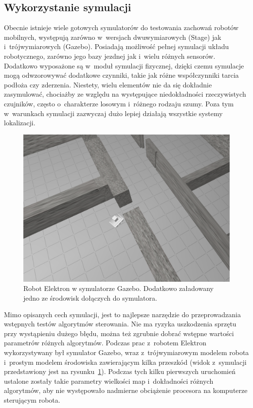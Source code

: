 \subsection{Wykorzystanie symulacji}

Obecnie istnieje wiele gotowych symulatorów do testowania zachowań robotów
mobilnych, występują zarówno w~wersjach dwuwymiarowych (Stage) jak i~trójwymiarowych
(Gazebo). Posiadają możliwość pełnej symulacji układu robotycznego, zarówno
jego bazy jezdnej jak i~wielu różnych sensorów. Dodatkowo wyposażone są
w~moduł symulacji fizycznej, dzięki czemu symulacje mogą odwzorowywać dodatkowe
czynniki, takie jak różne współczynniki tarcia podłoża czy zderzenia.
Niestety, wielu elementów nie da się dokładnie zasymulować, chociażby ze
względu na występujące niedokładności rzeczywistych czujników, często o~charakterze
losowym i~różnego rodzaju szumy. Poza tym w~warunkach symulacji zazwyczaj dużo
lepiej działają wszystkie systemy lokalizacji.

\begin{figure}[htb!]
\centering
\includegraphics[width=13cm]{../img/gazebo}
\caption[Robot Elektron w symulatorze Gazebo]{Robot Elektron w symulatorze Gazebo.
Dodatkowo załadowany jedno ze środowisk dołączych do symulatora.}
\label{fig:gazebo}
\end{figure}

Mimo opisanych cech symulacji, jest to najlepsze narzędzie do przeprowadzania
wstępnych testów algorytmów sterowania. Nie ma ryzyka uszkodzenia sprzętu
przy wystąpieniu dużego błędu, można też zgrubnie dobrać wstępne wartości
parametrów różnych algorytmów. Podczas prac z~robotem Elektron wykorzystywany
był symulator Gazebo, wraz z~trójwymiarowym modelem robota i~prostym modelem
środowiska zawierającym kilka przeszkód (widok z~symulacji przedstawiony jest
na rysunku~\ref{fig:gazebo}). Podczas tych kilku pierwszych uruchomień
ustalone zostały takie parametry wielkości map i~dokładności różnych algorytmów,
aby nie występowało nadmierne obciążenie procesora na komputerze sterującym
robota.

